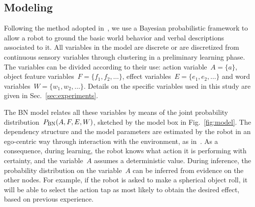 \subsection{\AffWords{} Modeling}
\label{sec:bn}
Following the method adopted in~\cite{salvi:2012:smcb}, we use a Bayesian probabilistic framework to allow a robot to ground the basic world behavior and verbal descriptions associated to it.
All variables in the model are discrete or are discretized from continuous sensory variables through clustering in a preliminary learning phase.
The variables can be divided according to their use: action variable~$A = \{a\}$, object feature variables~$F=\{f_1, f_2, \dots\}$, effect variables~$E=\{e_1, e_2, \dots\}$ and word variables~$W = \{w_1, w_2, \dots\}$.
Details on the specific variables used in this study are given in Sec.~\ref{sec:experiments}.

The \ac{BN} model relates all these variables by means of the joint probability distribution~$P_{\text{BN}}(A, F, E, W)$, sketched by the \AffWords{} model box in Fig.~\ref{fig:model}.
The dependency structure and the model parameters are estimated by the robot in an ego-centric way through interaction with the environment, as in~\cite{salvi:2012:smcb}.
As a consequence, during learning, the robot knows what action it is performing with certainty, and the variable~$A$ assumes a deterministic value.
During inference, the probability distribution on the variable~$A$ can be inferred from evidence on the other nodes.
For example, if the robot is asked to make a spherical object roll, it will be able to select the action tap as most likely to obtain the desired effect, based on previous experience.

\newcommand{\myscalefactor}{0.8}

\newcommand{\shapeOfHmmState}{circle} %

\newcommand{\standardhmm}[1]{
    \node[draw,\shapeOfHmmState] (hmm#1s1) {$s_1$};
    \node[draw,\shapeOfHmmState, right of=hmm#1s1] (hmm#1s2) {$s_2$};
    \node[\shapeOfHmmState, right of=hmm#1s2] (hmm#1s3) {\dots};
    \node[draw,\shapeOfHmmState, right of=hmm#1s3] (hmm#1s4) {$s_Q$};
    \node[left of=hmm#1s1]  (invisible1) {};
    \node[right of=hmm#1s4] (invisible2) {};
    \path[->] (hmm#1s1) edge (hmm#1s2);
    \path[loop above] (hmm#1s1) edge (hmm#1s1);
    \path[->] (hmm#1s2) edge (hmm#1s3);
    \path[loop above] (hmm#1s2) edge (hmm#1s2);
    \path[dashed] (hmm#1s2) -- (hmm#1s3);
    \path[->] (hmm#1s3) edge (hmm#1s4);
    \path[loop above] (hmm#1s4) edge (hmm#1s4);
    \path[->] (invisible1) edge (hmm#1s1);
    \path[->] (hmm#1s4) edge (invisible2);
}


